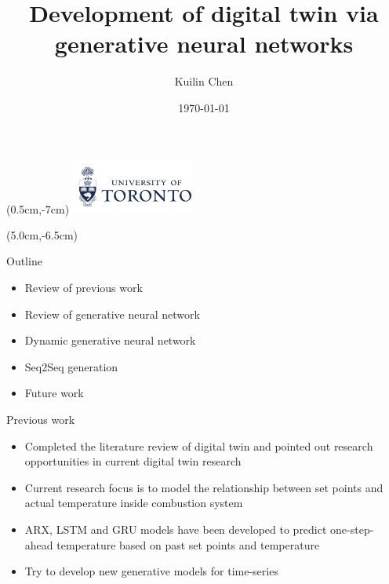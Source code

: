 \documentclass [aspectratio=169]{beamer}
\title[]{Development of digital twin via generative neural networks}
\author[]{Kuilin Chen}
\date{\today}
\newcommand*{\logofont}{\fontfamily{phv}\selectfont}
\begin{document}
{
\begin{frame}
    \titlepage
    \begin{textblock*}{4cm}(0.5cm,-7cm)
        \includegraphics[width=4cm]{logo_uoft.png}
    \end{textblock*}
    \begin{textblock*}{8cm}(5.0cm,-6.5cm)
        \huge \color{uoftblue}{$\Bigr\rvert$ \hspace{0.15cm} \textbf{\logofont Engineering}}
    \end{textblock*}
\end{frame}
}

\begin{frame}{Outline}
    \begin{itemize}
    	\item Review of previous work
        \item Review of generative neural network
        \item Dynamic generative neural network
        \item Seq2Seq generation
        \item Future work
    \end{itemize}
    
\end{frame}

\begin{frame}{Previous work}
    \begin{itemize}
        \item Completed the literature review of digital twin and pointed out research opportunities in current digital twin research
        \item Current research focus is to model the relationship between set points and actual temperature inside combustion system
        \item ARX, LSTM and GRU models have been developed to predict one-step-ahead temperature based on past set points and temperature 
        \item Try to develop new generative models for time-series 
    \end{itemize}
\end{frame}
\end{document}
